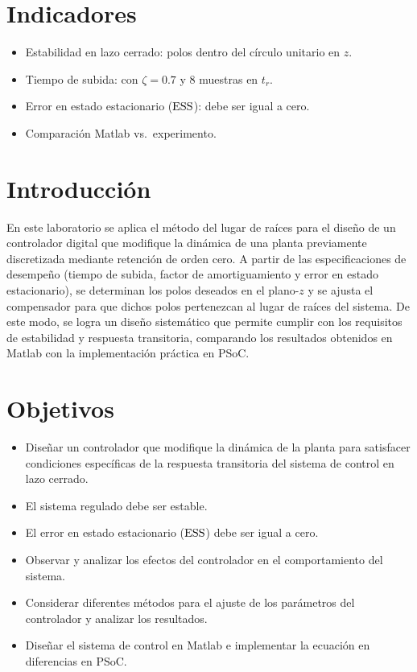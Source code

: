 \section{Indicadores}
\begin{itemize}
	\item Estabilidad en lazo cerrado: polos dentro del círculo unitario en $z$.
	\item Tiempo de subida: con $\zeta = 0.7$ y 8 muestras en $t_r$.
	\item Error en estado estacionario ($\mathrm{ESS}$): debe ser igual a cero.
	\item Comparación Matlab vs.\ experimento.
\end{itemize}
\section{Introducción}

En este laboratorio se aplica el método del lugar de raíces para el diseño de un controlador digital que modifique la dinámica de una planta previamente discretizada mediante retención de orden cero. A partir de las especificaciones de desempeño (tiempo de subida, factor de amortiguamiento y error en estado estacionario), se determinan los polos deseados en el plano-$z$ y se ajusta el compensador para que dichos polos pertenezcan al lugar de raíces del sistema. De este modo, se logra un diseño sistemático que permite cumplir con los requisitos de estabilidad y respuesta transitoria, comparando los resultados obtenidos en Matlab con la implementación práctica en PSoC.

\section{Objetivos}
\begin{itemize}
	\item Diseñar un controlador que modifique la dinámica de la planta para satisfacer condiciones específicas de la respuesta transitoria del sistema de control en lazo cerrado.
	\item El sistema regulado debe ser estable.  
	\item El error en estado estacionario ($\mathrm{ESS}$) debe ser igual a cero.  
	\item Observar y analizar los efectos del controlador en el comportamiento del sistema.  
	\item Considerar diferentes métodos para el ajuste de los parámetros del controlador y analizar los resultados.  
	\item Diseñar el sistema de control en Matlab e implementar la ecuación en diferencias en PSoC.  
	
\end{itemize}


